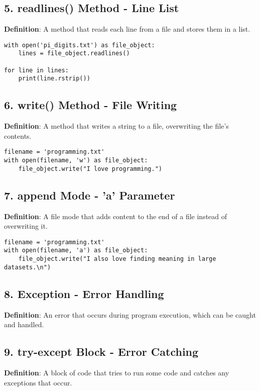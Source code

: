 \subsection*{5. readlines() Method - Line List}
\textbf{Definition}: A method that reads each line from a file and stores them in a list.

\begin{lstlisting}
with open('pi_digits.txt') as file_object:
    lines = file_object.readlines()

for line in lines:
    print(line.rstrip())
\end{lstlisting}

\subsection*{6. write() Method - File Writing}
\textbf{Definition}: A method that writes a string to a file, overwriting the file's contents.

\begin{lstlisting}
filename = 'programming.txt'
with open(filename, 'w') as file_object:
    file_object.write("I love programming.")
\end{lstlisting}

\subsection*{7. append Mode - 'a' Parameter}
\textbf{Definition}: A file mode that adds content to the end of a file instead of overwriting it.

\begin{lstlisting}
filename = 'programming.txt'
with open(filename, 'a') as file_object:
    file_object.write("I also love finding meaning in large datasets.\n")
\end{lstlisting}

\subsection*{8. Exception - Error Handling}
\textbf{Definition}: An error that occurs during program execution, which can be caught and handled.



\subsection*{9. try-except Block - Error Catching}
\textbf{Definition}: A block of code that tries to run some code and catches any exceptions that occur.

